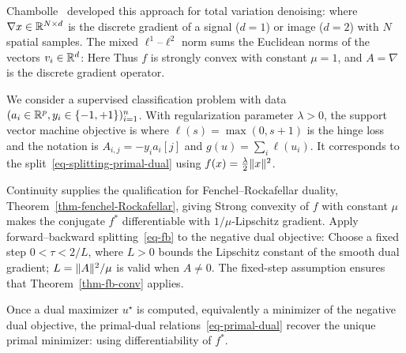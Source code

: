 \begin{exmp}[TV denoising]
Chambolle~\cite{chambolle-algo-tv} developed this approach for total variation denoising:
where $\nabla x \in \mathbb{R}^{N \times d}$ is the discrete gradient of a signal ($d=1$) or image ($d=2$) with $N$ spatial samples. The mixed $\ell^1$--$\ell^2$ norm sums the Euclidean norms of the vectors $v_i\in\mathbb{R}^d$:
Here 
Thus $f$ is strongly convex with constant $\mu=1$, and $A=\nabla$ is the discrete gradient operator.
\end{exmp}

\begin{exmp}
	We consider a supervised classification problem with data $(a_i \in \mathbb{R}^p, y_i \in \{-1,+1\})_{i=1}^n$.
	With regularization parameter $\lambda>0$, the support vector machine objective is
	where $\ell(s) = \max(0,s+1)$ is the hinge loss and
	the notation is $A_{i,j}=-y_i a_i[j]$ and $g(u)=\sum_i\ell(u_i)$.
	It corresponds to the split~\eqref{eq-splitting-primal-dual} using $f(x) = \frac{\lambda}{2}\lVert x\rVert^2$. 
\end{exmp}


Continuity supplies the qualification for Fenchel--Rockafellar duality, Theorem~\ref{thm-fenchel-Rockafellar}, giving
Strong convexity of $f$ with constant $\mu$ makes the conjugate $f^*$ differentiable with $1/\mu$-Lipschitz gradient. Apply forward--backward splitting~\eqref{eq-fb} to the negative dual objective:
Choose a fixed step $0<\tau<2/L$, where $L>0$ bounds the Lipschitz constant of the smooth dual gradient; $L=\lVert A\rVert^2/\mu$ is valid when $A\neq0$. The fixed-step assumption ensures that Theorem~\ref{thm-fb-conv} applies.

Once a dual maximizer $u^\star$ is computed, equivalently a minimizer of the negative dual objective, the primal-dual relations~\eqref{eq-primal-dual} recover the unique primal minimizer:
using differentiability of $f^*$.


